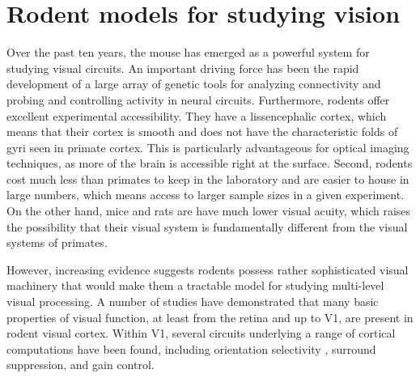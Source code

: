 \section{Rodent models for studying vision}
Over the past ten years, the mouse has emerged as a powerful system for studying visual circuits. An important driving force has been the rapid development of a large array of genetic tools for analyzing connectivity and probing and controlling activity in neural circuits\cite{Luo2008, Luo2018}. Furthermore, rodents offer excellent experimental accessibility. They have a lissencephalic cortex, which means that their cortex is smooth and does not have the characteristic folds of gyri seen in primate cortex. This is particularly advantageous for optical imaging techniques, as more of the brain is accessible right at the surface. Second, rodents cost much less than primates to keep in the laboratory and are easier to house in large numbers, which means access to larger sample sizes in a given experiment. On the other hand, mice and rats are have much lower visual acuity, which raises the possibility that their visual system is fundamentally different from the visual systems of primates. 

However, increasing evidence suggests rodents possess rather sophisticated visual machinery that would make them a tractable model for studying multi-level visual processing. A number of studies have demonstrated that many basic properties of visual function, at least from the retina and up to V1, are present in rodent visual cortex\cite{Huberman2011}. Within V1, several circuits underlying a range of cortical computations have been found, including orientation selectivity \cite{Ko2011, Lien2013}, surround suppression\cite{Adesnik2012}, and gain control\cite{Atallah2012}. 

